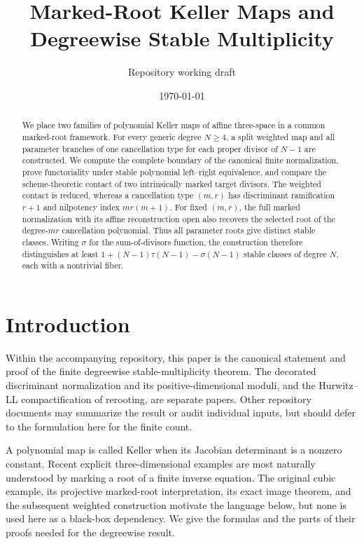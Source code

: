 \documentclass[11pt]{article}
\title{Marked-Root Keller Maps and Degreewise Stable Multiplicity}
\author{Repository working draft}
\date{\today}
\begin{document}
\maketitle

\begin{abstract}
We place two families of polynomial Keller maps of affine three-space in a
common marked-root framework.  For every generic degree $N\ge4$, a split
weighted map and all parameter branches of one cancellation type for each
proper divisor of $N-1$ are constructed.  We compute the complete boundary of the canonical finite
normalization, prove functoriality under stable polynomial left--right
equivalence, and compare the scheme-theoretic contact of two intrinsically
marked target divisors.  The weighted contact is
reduced, whereas a cancellation type $(m,r)$ has discriminant ramification
$r+1$ and nilpotency index $mr(m+1)$.  For fixed $(m,r)$, the full marked
normalization with its affine reconstruction open also recovers the selected
root of the degree-$mr$ cancellation polynomial.  Thus all parameter roots
give distinct stable classes.  Writing $\sigma$ for the sum-of-divisors
function, the construction therefore distinguishes at least
$1+(N-1)\tau(N-1)-\sigma(N-1)$ stable classes of degree $N$, each with a
nontrivial fiber.
\end{abstract}

\section{Introduction}

Within the accompanying repository, this paper is the canonical statement and
proof of the finite degreewise stable-multiplicity theorem.  The decorated
discriminant normalization and its positive-dimensional moduli, and the
Hurwitz--LL compactification of rerooting, are separate papers.  Other
repository documents may summarize the result or audit individual inputs,
but should defer to the formulation here for the finite count.

A polynomial map is called Keller when its Jacobian determinant is a
nonzero constant.  Recent explicit three-dimensional examples are most
naturally understood by marking a root of a finite inverse equation.  The
original cubic example, its projective marked-root interpretation, its exact
image theorem, and the subsequent weighted construction motivate the
language below, but none is used here as a black-box dependency.  We give
the formulas and the parts of their proofs needed for the degreewise result.
\end{document}
